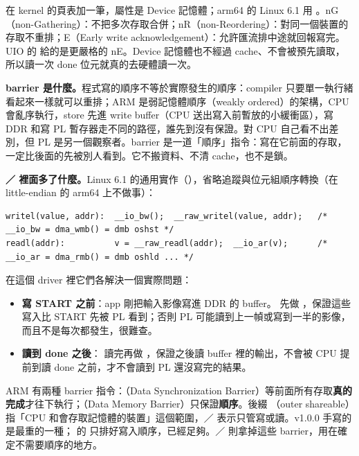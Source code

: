  在 kernel 的頁表加一筆，屬性是 Device 記憶體；arm64 的 Linux 6.1 用 。nG（non-Gathering）：不把多次存取合併；nR（non-Reordering）：對同一個裝置的存取不重排；E（Early write acknowledgement）：允許匯流排中途就回報寫完。UIO 的  給的是更嚴格的 nE。Device 記憶體也不經過 cache、不會被預先讀取，所以讀一次 done 位元就真的去硬體讀一次。

\textbf{barrier 是什麼。}程式寫的順序不等於實際發生的順序：compiler 只要單一執行緒看起來一樣就可以重排；ARM 是弱記憶體順序（weakly ordered）的架構，CPU 會亂序執行，store 先進 write buffer（CPU 送出寫入前暫放的小緩衝區），寫 DDR 和寫 PL 暫存器走不同的路徑，誰先到沒有保證。對 CPU 自己看不出差別，但 PL 是另一個觀察者。barrier 是一道「順序」指令：寫在它前面的存取，一定比後面的先被別人看到。它不搬資料、不清 cache，也不是鎖。

\textbf{／ 裡面多了什麼。}Linux 6.1 的通用實作（），省略追蹤與位元組順序轉換（在 little-endian 的 arm64 上不做事）：

\begin{lstlisting}[numbers=none,xleftmargin=0pt]
writel(value, addr):  __io_bw();  __raw_writel(value, addr);   /* __io_bw = dma_wmb() = dmb oshst */
readl(addr):          v = __raw_readl(addr);  __io_ar(v);      /* __io_ar = dma_rmb() = dmb oshld ... */
\end{lstlisting}

在這個 driver 裡它們各解決一個實際問題：
\begin{itemize}
\item \textbf{寫 START 之前}：app 剛把輸入影像寫進 DDR 的 buffer。 先做 ，保證這些寫入比 START 先被 PL 看到；否則 PL 可能讀到上一幀或寫到一半的影像，而且不是每次都發生，很難查。
\item \textbf{讀到 done 之後}： 讀完再做 ，保證之後讀 buffer 裡的輸出，不會被 CPU 提前到讀 done 之前，才不會讀到 PL 還沒寫完的結果。
\end{itemize}

ARM 有兩種 barrier 指令：（Data Synchronization Barrier）等前面所有存取\textbf{真的完成}才往下執行；（Data Memory Barrier）只保證\textbf{順序}。後綴 （outer shareable）指「CPU 和會存取記憶體的裝置」這個範圍，／ 表示只管寫或讀。v1.0.0 手寫的  是最重的一種； 的  只排好寫入順序，已經足夠。／ 則拿掉這些 barrier，用在確定不需要順序的地方。


